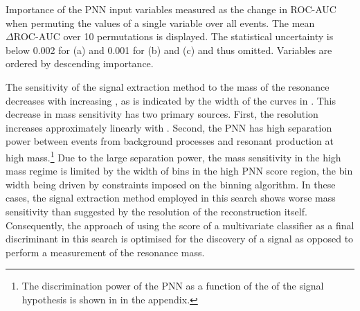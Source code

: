 \begin{table}[htbp]
  \centering


  \caption[Importance of the input variables in the PNN
  discriminant.]{Importance of the PNN input variables measured as the change in
    ROC-AUC when permuting the values of a single variable over all events. The
    mean $\Delta\text{ROC-AUC}$ over 10 permutations is displayed. The
    statistical uncertainty is below 0.002 for (a) and 0.001 for (b) and (c) and
    thus omitted. Variables are ordered by descending importance.}%
  \label{tab:pnn_ranking}

  \begin{subtable}[t]{.33\textwidth}
    \centering
    \renewcommand{\arraystretch}{1.12}
    
  \end{subtable}%
  \begin{subtable}[t]{.33\textwidth}
    \centering
    \renewcommand{\arraystretch}{1.12}
    
  \end{subtable}%
  \begin{subtable}[t]{.33\textwidth}
    \centering
    \renewcommand{\arraystretch}{1.12}
    
  \end{subtable}

\end{table}

The sensitivity of the signal extraction method to the mass of the resonance
decreases with increasing \mX, as is indicated by the width of the curves in
. This decrease in mass sensitivity has two primary
sources. First, the \mHH resolution increases approximately linearly with
\mX. Second, the PNN has high separation power between events from background
processes and resonant \HH production at high mass.\footnote{The discrimination
  power of the PNN as a function of the \mX of the signal hypothesis is shown in
   in the appendix.}  Due to the large separation
power, the mass sensitivity in the high mass regime is limited by the width of
bins in the high PNN score region, the bin width being driven by constraints
imposed on the binning algorithm. In these cases, the signal extraction method
employed in this search shows worse mass sensitivity than suggested by the
resolution of the \mHH reconstruction itself. Consequently, the approach of
using the score of a multivariate classifier as a final discriminant in this
search is optimised for the discovery of a signal as opposed to perform a
measurement of the resonance mass.

